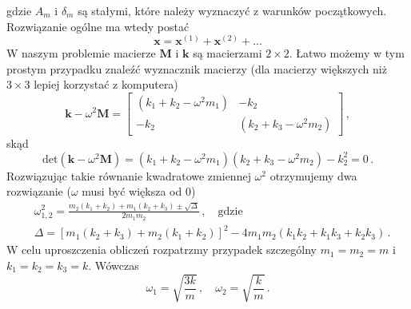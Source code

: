 \documentclass[../main.tex]{subfiles}
\begin{document}
        gdzie \(A_m\) i \(\delta_m\) są stałymi, które należy wyznaczyć z warunków początkowych.
        Rozwiązanie ogólne ma wtedy postać
        \begin{equation*}
            \mathbf{x}=\mathbf{x}^{(1)}+\mathbf{x}^{(2)}+...
        \end{equation*}
        W naszym problemie macierze \(\mathbf{M}\) i \(\mathbf{k}\) są macierzami \(2\times 2\).
        Łatwo możemy w tym prostym przypadku znaleźć wyznacznik macierzy (dla macierzy większych niż
        \(3\times3\) lepiej korzystać z komputera)
        \begin{equation*}
            \mathbf{k}-\omega^2\mathbf{M}=\begin{bmatrix}(k_1+k_2-\omega^2m_1)&-k_2\\-k_2&(k_2+k_3-\omega^2m_2)\end{bmatrix}\,,
        \end{equation*}
        skąd
        \begin{equation*}
            \text{det}(\mathbf{k}-\omega^2\mathbf{M})=(k_1+k_2-\omega^2m_1)(k_2+k_3-\omega^2m_2)-k_2^2=0\,.
        \end{equation*}
        Rozwiązując takie równanie kwadratowe zmiennej \(\omega^2\) otrzymujemy dwa rozwiązanie
        (\(\omega\) musi być większa od 0)
        \begin{equation*}
        \begin{split}
            &\omega^2_{1,2}=\frac{m_2(k_1+k_2)+m_1(k_2+k_3)\pm\sqrt{\Delta}}{2m_1m_2}\,,\quad\text{gdzie}\\
            &\Delta=\left[m_1(k_2+k_3)+m_2(k_1+k_2)\right]^2-4m_1m_2(k_1k_2+k_1k_3+k_2k_3)\,.
        \end{split}
        \end{equation*}
        W celu uproszczenia obliczeń rozpatrzmy przypadek szczególny \(m_1=m_2=m\) i
        \(k_1=k_2=k_3=k\). Wówczas
        \begin{equation*}
                \omega_{1}=\sqrt{\frac{3k}{m}}\,,\quad \omega_2=\sqrt{\frac{k}{m}}\,.
        \end{equation*}
\end{document}
